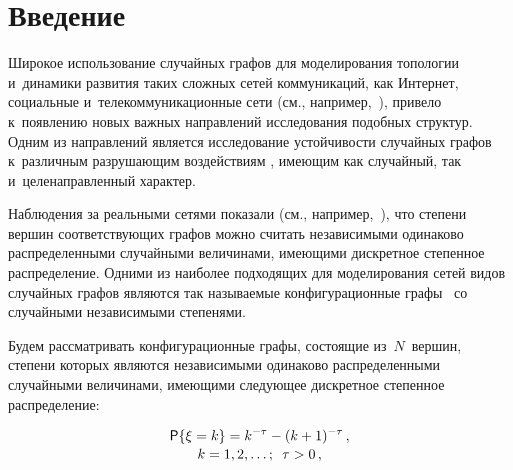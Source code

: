 
  
\vspace*{-1pt}



\thispagestyle{headings}

\begin{multicols}{2}

\label{st\stat}


\section{Введение}


Широкое использование случайных графов для моделирования топологии и~динамики
развития таких слож\-ных сетей коммуникаций, как Интернет, социальные 
и~телекоммуникационные сети (см., например,~\cite{Dur,Hof}), привело к~появлению
новых важ\-ных на\-прав\-ле\-ний исследования по\-доб\-ных структур. Одним из 
на\-прав\-ле\-ний
является исследование устой\-чи\-вости случайных графов к~различным раз\-ру\-ша\-ющим
воздействиям \cite{Dur,Coh,Bol2}, име\-ющим как случайный, так и~целенаправленный
характер.
{

}

Наблюдения за реальными сетями показали (см., например,~\cite{Dur,Fa,RN1}), что
степени вершин соответствующих графов мож\-но считать независимыми одинаково
распределенными случайными величинами, име\-ющи\-ми дискретное степенное распределение.
Одними из наиболее подходящих для моделирования сетей видов случайных графов являются
так называемые конфигурационные графы~\cite{Bol1} со случайными независимыми степенями.

Будем рассматривать конфигурационные графы, состоящие из~$N$~вершин, степени которых
являются независимыми одинаково распределенными случайными величинами, име\-ющи\-ми
сле\-ду\-ющее дискретное степенное распределение:


\noindent
\begin{multline}
\label{EQ:1}
{\sf P}\{\xi = k\} = k^{-\tau} - (k+1)^{-\tau}\,, \\[-2pt] 
k=1,2,\dots; \enskip \tau >0\,,
\end{multline}


\end{multicols}
